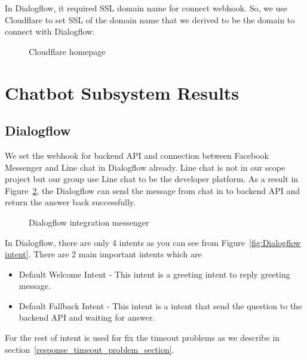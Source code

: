 \documentclass[12pt,oneside,openright,a4paper]{cpe-english-project}
\begin{document}
In Dialogflow, it required SSL domain name for connect webhook. %
So, we use Cloudflare to set SSL of the domain name that we derived
to be the domain to connect with Dialogflow.
\begin{figure}[!h]\centering
	\caption{Cloudflare homepage}\label{fig:Cloudflare homepage}
\end{figure}

\pagebreak
\section{Chatbot Subsystem Results}
\subsection{Dialogflow}
We set the webhook for backend API and connection between
Facebook Messenger and Line chat in Dialogflow already.
Line chat is not in our scope project but our group use Line chat to be the developer platform.
As a result in Figure~\ref*{fig:line_example}, the Dialogflow can send the message from chat
in to backend API and return the answer back successfully.

\begin{figure}[!h]\centering
	\caption{Dialogflow integration messenger}\label{fig:line_example}
\end{figure}
In Dialogflow, there are only 4 intents as you can see from Figure~\ref*{fig:Dialogflow intent}.
There are 2 main important intents which are\begin{itemize}
	\item Default Welcome Intent - This intent is a greeting intent to reply greeting message.
	\item Default Fallback Intent - This intent is a intent that send the question to the backend API and waiting for answer.
\end{itemize}
For the rest of intent is used for fix the timeout problems as we describe in section~\ref*{response_timeout_problem_section}.
\end{document}
